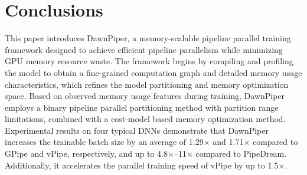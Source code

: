 \section{Conclusions}
\label{sec:conclusion}
This paper introduces DawnPiper,
a memory-scalable pipeline parallel training framework
designed to achieve efficient pipeline parallelism while minimizing GPU memory resource waste.
The framework begins by compiling and profiling the model to
obtain a fine-grained computation graph and detailed memory usage characteristics,
which refines the model partitioning and memory optimization space.
Based on observed memory usage features during training,
DawnPiper employs a binary pipeline parallel partitioning method with partition range limitations,
combined with a cost-model based memory optimization method.
Experimental results on four typical DNNs demonstrate that
DawnPiper increases the trainable batch size by an average of 1.29$\times$ and 1.71$\times$ compared to GPipe and vPipe, respectively,
and up to 4.8$\times$–11$\times$ compared to PipeDream.
Additionally, it accelerates the parallel training speed of vPipe by up to 1.5$\times$.